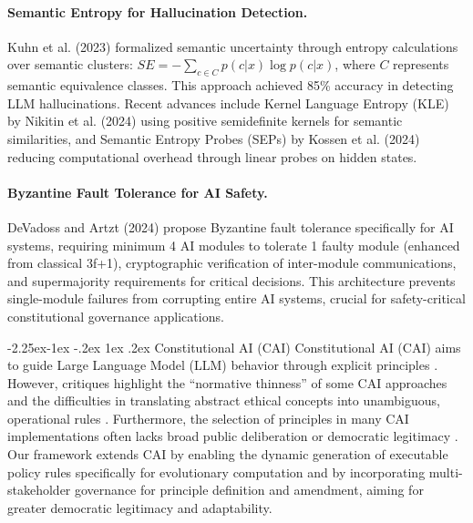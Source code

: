 \documentclass[manuscript,screen,9pt]{acmart}
\makeatletter
\renewcommand\subsection{\@startsection{subsection}{2}{\z@}%
  {-2.25ex\@plus -1ex \@minus -.2ex}%
  {1ex \@plus .2ex}%
  {\normalfont\large\bfseries}}
\makeatother
\begin{document}
\paragraph{Semantic Entropy for Hallucination Detection.} Kuhn et al. (2023) formalized semantic uncertainty through entropy calculations over semantic clusters: $SE = -\sum_{c \in C} p(c|x) \log p(c|x)$, where $C$ represents semantic equivalence classes. This approach achieved 85\% accuracy in detecting LLM hallucinations. Recent advances include Kernel Language Entropy (KLE) by Nikitin et al. (2024) using positive semidefinite kernels for semantic similarities, and Semantic Entropy Probes (SEPs) by Kossen et al. (2024) reducing computational overhead through linear probes on hidden states.

\paragraph{Byzantine Fault Tolerance for AI Safety.} DeVadoss and Artzt (2024) propose Byzantine fault tolerance specifically for AI systems, requiring minimum 4 AI modules to tolerate 1 faulty module (enhanced from classical 3f+1), cryptographic verification of inter-module communications, and supermajority requirements for critical decisions. This architecture prevents single-module failures from corrupting entire AI systems, crucial for safety-critical constitutional governance applications.

\subsection{Constitutional AI (CAI)}
Constitutional AI (CAI) aims to guide Large Language Model (LLM) behavior through explicit principles \cite{Bai2025ConstitutionalAI}. However, critiques highlight the ``normative thinness'' of some CAI approaches and the difficulties in translating abstract ethical concepts into unambiguous, operational rules \cite{DigiCon2025ConstitutionalAIThin, ChaconMenke2025CAISmallLLMs}. Furthermore, the selection of principles in many CAI implementations often lacks broad public deliberation or democratic legitimacy \cite{Hwang2025PublicCAI}. Our framework extends CAI by enabling the dynamic generation of executable policy rules specifically for evolutionary computation and by incorporating multi-stakeholder governance for principle definition and amendment, aiming for greater democratic legitimacy and adaptability.
\end{document}
